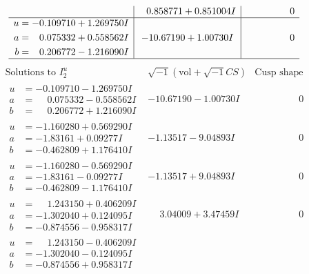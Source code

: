 \documentclass[1p]{elsarticle_modified}
\theoremstyle{definition}
\newcommand{\I}{\sqrt{-1}}
\begin{document}
$$\begin{array}{c|c|c}
 & \phantom{-}0.858771 + 0.851004 I & \phantom{-0.000000 } 0 \\ \hline\begin{aligned}
u &= -0.109710 + 1.269750 I \\
a &= \phantom{-}0.075332 + 0.558562 I \\
b &= \phantom{-}0.206772 - 1.216090 I\end{aligned}
 & -10.67190 + 1.00730 I & \phantom{-0.000000 } 0\\
 \hline 
 \end{array}$$\newpage$$\begin{array}{c|c|c}  
\text{Solutions to }I^u_{2}& \I (\text{vol} + \sqrt{-1}CS) & \text{Cusp shape}\\
 \hline 
\begin{aligned}
u &= -0.109710 - 1.269750 I \\
a &= \phantom{-}0.075332 - 0.558562 I \\
b &= \phantom{-}0.206772 + 1.216090 I\end{aligned}
 & -10.67190 - 1.00730 I & \phantom{-0.000000 } 0 \\ \hline\begin{aligned}
u &= -1.160280 + 0.569290 I \\
a &= -1.83161 + 0.09277 I \\
b &= -0.462809 + 1.176410 I\end{aligned}
 & -1.13517 - 9.04893 I & \phantom{-0.000000 } 0 \\ \hline\begin{aligned}
u &= -1.160280 - 0.569290 I \\
a &= -1.83161 - 0.09277 I \\
b &= -0.462809 - 1.176410 I\end{aligned}
 & -1.13517 + 9.04893 I & \phantom{-0.000000 } 0 \\ \hline\begin{aligned}
u &= \phantom{-}1.243150 + 0.406209 I \\
a &= -1.302040 + 0.124095 I \\
b &= -0.874556 - 0.958317 I\end{aligned}
 & \phantom{-}3.04009 + 3.47459 I & \phantom{-0.000000 } 0 \\ \hline\begin{aligned}
u &= \phantom{-}1.243150 - 0.406209 I \\
a &= -1.302040 - 0.124095 I \\
b &= -0.874556 + 0.958317 I\end{aligned}

\end{array}$$
\end{document}
